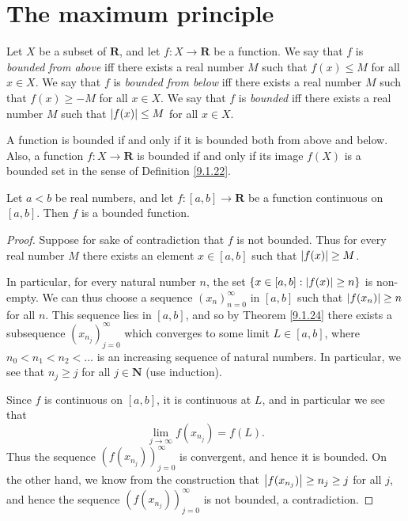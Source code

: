 \section{The maximum principle}\label{sec 9.6}

\begin{definition}\label{9.6.1}
    Let \(X\) be a subset of \(\mathbf{R}\), and let \(f : X \to \mathbf{R}\) be a function.
    We say that \(f\) is \emph{bounded from above} iff there exists a real number \(M\) such that \(f(x) \leq M\) for all \(x \in X\).
    We say that \(f\) is \emph{bounded from below} iff there exists a real number \(M\) such that \(f(x) \geq -M\) for all \(x \in X\).
    We say that \(f\) is \emph{bounded} iff there exists a real number \(M\) such that \(\abs*{f(x)} \leq M\) for all \(x \in X\).
\end{definition}

\begin{remark}\label{9.6.2}
    A function is bounded if and only if it is bounded both from above and below.
    Also, a function \(f : X \to \mathbf{R}\) is bounded if and only if its image \(f(X)\) is a bounded set in the sense of Definition \ref{9.1.22}.
\end{remark}

\begin{lemma}\label{9.6.3}
    Let \(a < b\) be real numbers, and let \(f : [a, b] \to \mathbf{R}\) be a function continuous on \([a, b]\).
    Then \(f\) is a bounded function.
\end{lemma}

\begin{proof}
    Suppose for sake of contradiction that \(f\) is not bounded.
    Thus for every real number \(M\) there exists an element \(x \in [a, b]\) such that \(\abs*{f(x)} \geq M\).

    In particular, for every natural number \(n\), the set \(\{x \in [a, b] : \abs*{f(x)} \geq n\}\) is non-empty.
    We can thus choose a sequence \((x_n)_{n = 0}^\infty\) in \([a, b]\) such that \(\abs*{f(x_n)} \geq n\) for all \(n\).
    This sequence lies in \([a, b]\), and so by Theorem \ref{9.1.24} there exists a subsequence \((x_{n_j})_{j = 0}^\infty\) which converges to some limit \(L \in [a, b]\), where \(n_0 < n_1 < n_2 < \dots\) is an increasing sequence of natural numbers.
    In particular, we see that \(n_j \geq j\) for all \(j \in \mathbf{N}\) (use induction).

    Since \(f\) is continuous on \([a, b]\), it is continuous at \(L\), and in particular we see that
    \[
        \lim_{j \to \infty} f(x_{n_j}) = f(L).
    \]
    Thus the sequence \((f(x_{n_j}))_{j = 0}^\infty\) is convergent, and hence it is bounded.
    On the other hand, we know from the construction that \(\abs*{f(x_{n_j})} \geq n_j \geq j\) for all \(j\), and hence the sequence \((f(x_{n_j}))_{j = 0}^\infty\) is not bounded, a contradiction.
\end{proof}